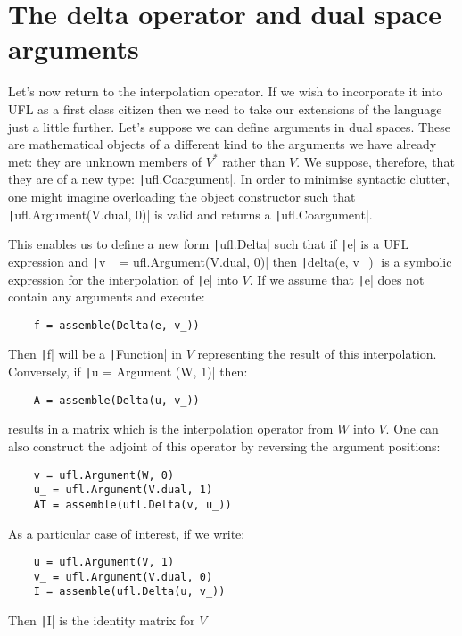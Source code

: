 \documentclass[a4paper,11pt]{article}
\begin{document}
\section{The delta operator and dual space arguments}

Let's now return to the interpolation operator. If we wish to incorporate it into UFL as a first class citizen then we need to take our extensions of the language just a little further. Let's suppose we can define arguments in dual spaces. These are mathematical objects of a different kind to the arguments we have already met: they are unknown members of $V^*$ rather than $V$. We suppose, therefore, that they are of a new type: \texttt|ufl.Coargument|. In order to minimise syntactic clutter, one might imagine overloading the object constructor such that \texttt|ufl.Argument(V.dual, 0)| is valid and returns a \texttt|ufl.Coargument|.

This enables us to define a new form \texttt|ufl.Delta| such that if \texttt|e| is a UFL expression and \texttt|v_ = ufl.Argument(V.dual, 0)| then \texttt|delta(e, v_)| is a symbolic expression for the interpolation of \texttt|e| into $V$. If we assume that \texttt|e| does not contain any arguments and execute:
\begin{verbatim}
    f = assemble(Delta(e, v_))
\end{verbatim}
Then \texttt|f| will be a \texttt|Function| in $V$ representing the result of this interpolation. Conversely, if \texttt|u = Argument (W, 1)| then:
\begin{verbatim}
    A = assemble(Delta(u, v_))
\end{verbatim}
results in a matrix which is the interpolation operator from $W$ into $V$. One can also construct the adjoint of this operator by reversing the argument positions:
\begin{verbatim}
    v = ufl.Argument(W, 0)
    u_ = ufl.Argument(V.dual, 1)
    AT = assemble(ufl.Delta(v, u_))
\end{verbatim}
As a particular case of interest, if we write:
\begin{verbatim}
    u = ufl.Argument(V, 1)
    v_ = ufl.Argument(V.dual, 0)
    I = assemble(ufl.Delta(u, v_))
\end{verbatim}
Then \texttt|I| is the identity matrix for $V$
\end{document}
